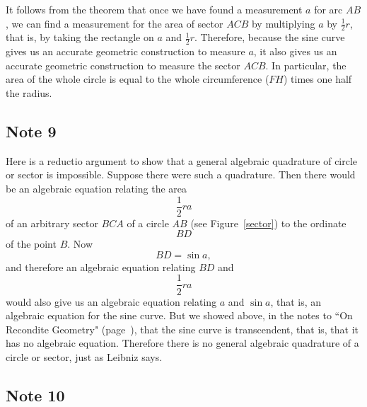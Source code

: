 \documentclass[twoside,openright]{article}
\begin{document}
It follows from the theorem that once we have found a measurement $a$
for arc $AB$, we can find a measurement for the area of sector $ACB$
by multiplying $a$ by $\frac{1}{2}r$, that is, by taking the rectangle
on $a$ and $\frac{1}{2}r$.  Therefore, because the sine curve gives us
an accurate geometric construction to measure $a$, it also gives us an
accurate geometric construction to measure the sector $ACB$.  In
particular, the area of the whole circle is equal to the whole
circumference ($FH$) times one half the radius.

\subsection*{Note 9}
\label{ctp9}

Here is a reductio argument to show that a general algebraic
quadrature of circle or sector is impossible.  Suppose there were such
a quadrature.  Then there would be an algebraic equation relating the
area
$$\frac{1}{2}ra$$
of an arbitrary sector $BCA$ of a circle $AB$ (see Figure~\ref{sector}) to the ordinate 
$$BD$$
of the point $B$.  Now
$$BD = \sin a,$$
and  therefore an algebraic equation relating $BD$ and 
$$\frac{1}{2}ra$$
would also give us an algebraic equation relating $a$ and $\sin a$,
that is, an algebraic equation for the sine curve.  But we showed
above, in the notes to ``On Recondite Geometry"
(page~\pageref{sintran}), that the sine curve is transcendent, that
is, that it has no algebraic equation.  Therefore there is no general
algebraic quadrature of a circle or sector, just as Leibniz says.

\subsection*{Note 10}
\label{ctp10}
\end{document}
